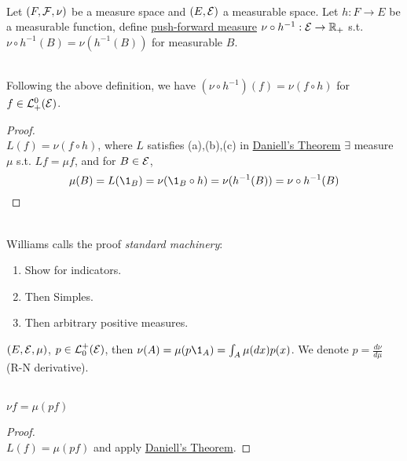 \vspace{3pt}
\begin{definition}\ \\
Let $(F,\mathcal{F},\nu)$ be a measure space and $(E,\mathcal{E})$ a measurable space. Let $h: F \to E$ be a measurable function, define \underline{push-forward measure} $\nu \circ h^{-1}: \mathcal{E} \to \mathbb{R}_+$ s.t. $\nu \circ h^{-1}(B) = \nu(h^{-1}(B))$ for measurable $B$.
\end{definition}

\vspace{3pt}
\begin{theorem}\ \\
Following the above definition, we have $(\nu \circ h^{-1})(f) = \nu(f \circ h)$ for $f \in \mathcal{L}_+^0 (\mathcal{E})$.
\end{theorem}
\begin{proof}\ \\
 $L(f) = \nu(f \circ h)$, where $L$ satisfies (a),(b),(c) in \hyperref[Daniell's Theorem]{Daniell's Theorem} \imply  $\exists$ measure $\mu$ s.t. $Lf = \mu f$, and for $B \in \mathcal{E}$,
 \begin{equation*}
     \mu(B) = L(\1_B) = \nu(\1_B \circ h) = \nu(h^{-1}(B)) = \nu \circ h^{-1} (B)
 \end{equation*}
\end{proof}
\begin{remark}\ \\
Williams calls the proof \textit{standard machinery}:
\begin{enumerate}[label = (\roman*)]
    \item Show for indicators.
    \item Then Simples.
    \item Then arbitrary positive measures.
\end{enumerate}
\end{remark}

\begin{notation}
$(E,\mathcal{E},\mu)$, $p \in \mathcal{L}_0^+(\mathcal{E})$, then $\nu(A) = \mu(p \1_A) = \int_A \mu(dx) p(x)$. We denote $p = \frac{d\nu}{d\mu}$ (R-N derivative).
\end{notation}

\vspace{3pt}
\begin{proposition}\ \\
$\nu f = \mu (p f)$
\end{proposition}
\begin{proof}\ \\
$L(f) = \mu(pf)$ and apply \hyperref[Daniell's Theorem]{Daniell's Theorem}.
\end{proof}

